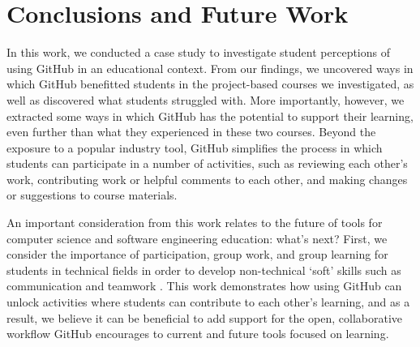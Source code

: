 \section{Conclusions and Future Work}



In this work, we conducted a case study to investigate student perceptions of using GitHub in an educational context. From our findings, we uncovered ways in which GitHub benefitted students in the project-based courses we investigated, as well as discovered what students struggled with. More importantly, however, we extracted some ways in which GitHub has the potential to support their learning, even further than what they experienced in these two courses. Beyond the exposure to a popular industry tool, GitHub simplifies the process in which students can participate in a number of activities, such as reviewing each other's work, contributing work or helpful comments to each other, and making changes or suggestions to course materials.

An important consideration from this work relates to the future of tools for computer science and software engineering education: what's next? First, we consider the importance of participation, group work, and group learning for students in technical fields in order to develop non-technical `soft' skills such as communication and teamwork \cite{jazayeri2004education}. This work demonstrates how using GitHub can unlock activities where students can contribute to each other's learning, and as a result, we believe it can be beneficial to add support for the open, collaborative workflow GitHub encourages to current and future tools focused on learning.



